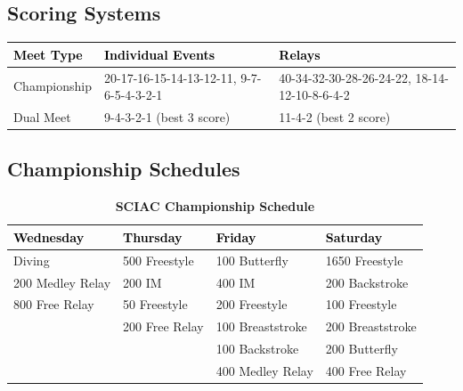 
\subsection*{Scoring Systems}

\begin{table}[H]
\centering
\renewcommand{\arraystretch}{1.4}
\begin{tabular}{p{3.5cm} p{5cm} p{5.5cm}}
\toprule
\rowcolor{teamprimary!25}
\textbf{\textcolor{black}{Meet Type}} & \textbf{\textcolor{black}{Individual Events}} & \textbf{\textcolor{black}{Relays}} \\
\midrule
\rowcolor{teamsecondary!15}
Championship & 20-17-16-15-14-13-12-11, 9-7-6-5-4-3-2-1 & 40-34-32-30-28-26-24-22, 18-14-12-10-8-6-4-2 \\
\rowcolor{teamprimary!10}
Dual Meet & 9-4-3-2-1 (best 3 score) & 11-4-2 (best 2 score) \\
\bottomrule
\end{tabular}
\end{table}


\subsection*{Championship Schedules}

\begin{table}[H]
\centering
\caption*{\textbf{\textcolor{teamprimary}{SCIAC Championship Schedule}}}
\renewcommand{\arraystretch}{1.3}
\begin{tabular}{p{3.5cm} p{3.5cm} p{3.5cm} p{3.5cm}}
\toprule
\rowcolor{teamprimary!25}
\textbf{\textcolor{black}{Wednesday}} & \textbf{\textcolor{black}{Thursday}} & \textbf{\textcolor{black}{Friday}} & \textbf{\textcolor{black}{Saturday}} \\
\midrule
\rowcolor{teamsecondary!12}
Diving & 500 Freestyle & 100 Butterfly & 1650 Freestyle \\
\rowcolor{teamprimary!8}
200 Medley Relay & 200 IM & 400 IM & 200 Backstroke \\
\rowcolor{teamsecondary!12}
800 Free Relay & 50 Freestyle & 200 Freestyle & 100 Freestyle \\
\rowcolor{teamprimary!8}
 & 200 Free Relay & 100 Breaststroke & 200 Breaststroke \\
\rowcolor{teamsecondary!12}
 &  & 100 Backstroke & 200 Butterfly \\
\rowcolor{teamprimary!8}
 &  & 400 Medley Relay & 400 Free Relay \\
\bottomrule
\end{tabular}
\end{table}

